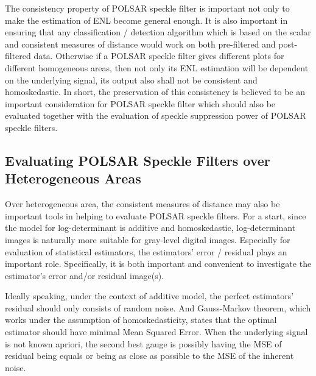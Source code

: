 The consistency property of POLSAR speckle filter is important
  not only to make the estimation of ENL become general enough.
It is also important in ensuring that any classification / detection algorithm
    which is based on the scalar and consistent measures of distance would work on both pre-filtered and post-filtered data.
Otherwise if a POLSAR speckle filter gives different plots for different homogeneous areas,
  then not only its ENL estimation will be dependent on the underlying signal, 
  its output also shall not be consistent and homoskedastic. %
In short, the preservation of this consistency is believed to be an important consideration for POLSAR speckle filter
  which should also be evaluated together with the evaluation of speckle suppression power of POLSAR speckle filters.
  
\subsection{Evaluating POLSAR Speckle Filters over Heterogeneous Areas}

Over heterogeneous area, the consistent measures of distance may also be important tools in helping to evaluate POLSAR speckle filters.
For a start, since the model for log-determinant is additive and homoskedastic,
  log-determinant images is naturally more suitable for gray-level digital images.
Especially for evaluation of statistical estimators,
  the estimators' error / residual plays an important role.
Specifically, it is both important and convenient to investigate the estimator's error and/or residual image(s).  

Ideally speaking, under the context of additive model,
  the perfect estimators' residual should only consists of random noise.
And Gauss-Markov theorem, which works under the assumption of homoskedasticity, states that the optimal estimator should have minimal Mean Squared Error.
When the underlying signal is not known apriori,
  the second best gauge is possibly having the MSE of residual being equals or being as close as possible to the MSE of the inherent noise.
  
